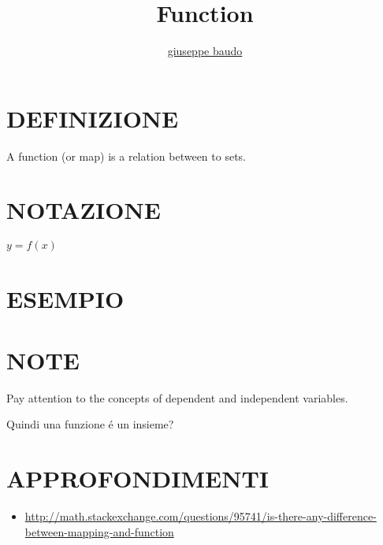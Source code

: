 \documentclass[a4paper,10pt]{article}
\title{Function}
\author{\href{http://www.baudo.hol.es}{giuseppe baudo}}
\begin{document}
\maketitle

\section{DEFINIZIONE}
A function (or map) is a relation between to sets.

\section{NOTAZIONE}
$y=f(x)$

\section{ESEMPIO}

\section{NOTE}
Pay attention to the concepts of dependent and independent variables.

Quindi una funzione \'{e} un insieme?

\section{APPROFONDIMENTI}
\begin{itemize}
 \item \url{http://math.stackexchange.com/questions/95741/is-there-any-difference-between-mapping-and-function}
\end{itemize}
\end{document}
